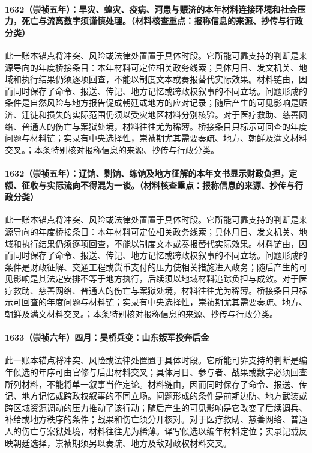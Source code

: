 \paragraph{1632（崇祯五年）：旱灾、蝗灾、疫病、河患与赈济的本年材料连接环境和社会压力，死亡与流离数字须谨慎处理。（材料核查重点：报称信息的来源、抄传与行政分类）} 此一账本锚点将冲突、风险或法律处置置于具体时段。它所能可靠支持的判断是来源导向的年度桥接条目：本年材料可定位相关政务线索；具体月日、发文机关、地域和执行结果仍须逐项回查，不能以制度文本或奏报替代实际效果。材料链由，因而同时保存了命令、报送、传记、地方记忆或跨政权叙事的不同立场。问题形成的条件是自然风险与地方报告促成朝廷或地方的应对记录；随后产生的可见影响是赈济、迁徙和损失的实际范围仍须以受灾地区材料分别核验。对于医疗救助、慈善网络、普通人的伤亡与案狱处境，材料往往尤为稀薄。桥接条目只标示可回查的年度问题与材料链；实录有中央选择性，崇祯期尤其需要奏疏、地方、朝鲜及满文材料交叉。；本条特别核对报称信息的来源、抄传与行政分类。

\paragraph{1632（崇祯五年）：辽饷、剿饷、练饷及地方征解的本年文书显示财政负担，定额、征收与实际流向不得混为一谈。（材料核查重点：报称信息的来源、抄传与行政分类）} 此一账本锚点将冲突、风险或法律处置置于具体时段。它所能可靠支持的判断是来源导向的年度桥接条目：本年材料可定位相关政务线索；具体月日、发文机关、地域和执行结果仍须逐项回查，不能以制度文本或奏报替代实际效果。材料链由，因而同时保存了命令、报送、传记、地方记忆或跨政权叙事的不同立场。问题形成的条件是财政征解、交通工程或货币支付的压力使相关措施进入政务；随后产生的可见影响是其法定安排不等于地方执行，后续须以地域材料追踪负担与成效。对于医疗救助、慈善网络、普通人的伤亡与案狱处境，材料往往尤为稀薄。桥接条目只标示可回查的年度问题与材料链；实录有中央选择性，崇祯期尤其需要奏疏、地方、朝鲜及满文材料交叉。；本条特别核对报称信息的来源、抄传与行政分类。

\paragraph{1633（崇祯六年）四月：吴桥兵变：山东叛军投奔后金} 此一账本锚点将冲突、风险或法律处置置于具体时段。它所能可靠支持的判断是编年候选的年序可由官修与后出材料交叉；具体月日、参与者、战果或数字必须回查所列材料，不能将单一叙事当作定论。材料链由，因而同时保存了命令、报送、传记、地方记忆或跨政权叙事的不同立场。问题形成的条件是前期边防、地方武装或跨区域资源调动的压力推动了该行动；随后产生的可见影响是它改变了后续调兵、补给或地方秩序的条件；战果和伤亡须分开核对。对于医疗救助、慈善网络、普通人的伤亡与案狱处境，材料往往尤为稀薄。译写候选以编年材料定位；实录记载反映朝廷选择，崇祯期须另以奏疏、地方及敌对政权材料交叉。

